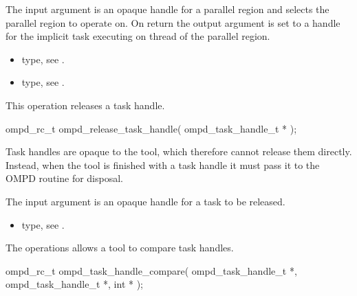 \argdesc
The input argument  is an opaque handle for a parallel region and selects the parallel region to operate on.
On return the output argument  is set to a handle for the implicit task
executing on  thread of the parallel region.

\crossreferences
\begin{itemize}
	\item {} type, see .
	\item {} type, see .
\end{itemize}

\label{ompd:ompd_release_task_handle}
\summary
This operation releases a task handle.

\format

\begin{cspecific}
\begin{ompSyntax}
ompd_rc_t ompd_release_task_handle(
  ompd_task_handle_t *
);
\end{ompSyntax}
\end{cspecific}


\descr
Task handles are opaque to the tool, which therefore cannot release
them directly. Instead, when the tool is finished with a task handle it must
pass it to the OMPD  routine
for disposal.

\argdesc
The input argument  is an opaque handle for a task
to be released.

\crossreferences
\begin{itemize}
	\item {} type, see .
\end{itemize}


\label{ompd:ompd_task_handle_compare}
\summary
The  operations allows a tool to compare task 
handles.

\format

\begin{cspecific}
\begin{ompSyntax}
ompd_rc_t ompd_task_handle_compare(
  ompd_task_handle_t *,
  ompd_task_handle_t *,
  int *
);
\end{ompSyntax}
\end{cspecific}


